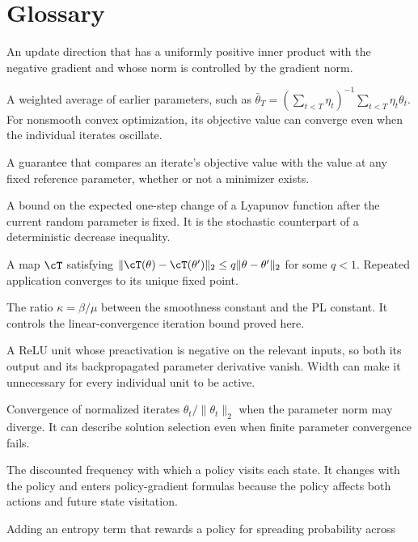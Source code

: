 \documentclass[11pt,twoside]{article}
\theoremstyle{definition}
\theoremstyle{remark}
\begin{document}
\section*{Glossary}

\begin{description}[style=nextline,leftmargin=1.5em,labelindent=0pt]
\item[Aligned update]
An update direction that has a uniformly positive inner product with the
negative gradient and whose norm is controlled by the gradient norm.
\item[Averaged iterate]
A weighted average of earlier parameters, such as
$\bar\theta_T=(\sum_{t<T}\eta_t)^{-1}\sum_{t<T}\eta_t\theta_t$.
For nonsmooth convex optimization, its objective value can converge even when
the individual iterates oscillate.
\item[Comparator bound]
A guarantee that compares an iterate's objective value with the value at any
fixed reference parameter, whether or not a minimizer exists.
\item[Conditional drift inequality]
A bound on the expected one-step change of a Lyapunov function after the
current random parameter is fixed. It is the stochastic counterpart of a
deterministic decrease inequality.
\item[Contraction]
A map $\cT$ satisfying
$\|\cT(\theta)-\cT(\theta')\|_2\le q\|\theta-\theta'\|_2$ for some
$q<1$. Repeated application converges to its unique fixed point.
\item[Condition number]
The ratio $\kappa=\beta/\mu$ between the smoothness constant and the PL
constant. It controls the linear-convergence iteration bound proved here.
\item[Dead ReLU]
A ReLU unit whose preactivation is negative on the relevant inputs, so both
its output and its backpropagated parameter derivative vanish. Width can make
it unnecessary for every individual unit to be active.
\item[Directional convergence]
Convergence of normalized iterates $\theta_t/\|\theta_t\|_2$ when the parameter
norm may diverge. It can describe solution selection even when finite
parameter convergence fails.
\item[Discounted occupancy measure]
The discounted frequency with which a policy visits each state. It changes
with the policy and enters policy-gradient formulas because the policy affects
both actions and future state visitation.
\item[Entropy regularization]
Adding an entropy term that rewards a policy for spreading probability across

\end{description}
\end{document}
